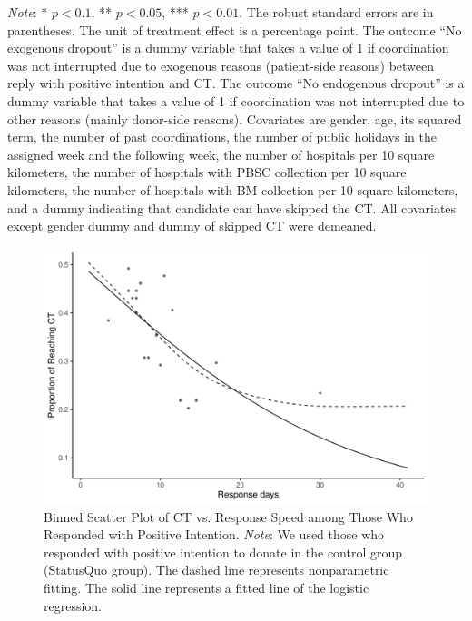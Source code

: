 \documentclass[12pt, a4paper]{article}
\begin{document}
\begin{table}[H]
\begin{threeparttable}
\begin{tablenotes}
\item \emph{Note}: * $p < 0.1$, ** $p < 0.05$, *** $p < 0.01$. The robust standard errors are in parentheses. The unit of treatment effect is a percentage point. The outcome ``No exogenous dropout'' is a dummy variable that takes a value of 1 if coordination was not interrupted due to exogenous reasons (patient-side reasons) between reply with positive intention and CT. The outcome ``No endogenous dropout'' is a dummy variable that takes a value of 1 if coordination was not interrupted due to other reasons (mainly donor-side reasons). Covariates are gender, age, its squared term, the number of past coordinations, the number of public holidays in the assigned week and the following week, the number of hospitals per 10 square kilometers, the number of hospitals with PBSC collection per 10 square kilometers, the number of hospitals with BM collection per 10 square kilometers, and a dummy indicating that candidate can have skipped the CT. All covariates except gender dummy and dummy of skipped CT were demeaned.
\end{tablenotes}
\end{threeparttable}
\end{table}

\begin{figure}[H]
\includegraphics{JMDP RCT - Online Supplementary Material_files/figure-latex/speed-CT-cond-response-1} \caption{Binned Scatter Plot of CT vs. Response Speed among Those Who Responded with Positive Intention. \newline \emph{Note}: We used those who responded with positive intention to donate in the control group (StatusQuo group). The dashed line represents nonparametric fitting. The solid line represents a fitted line of the logistic regression.}\label{fig:speed-CT-cond-response}
\end{figure}
\end{document}

